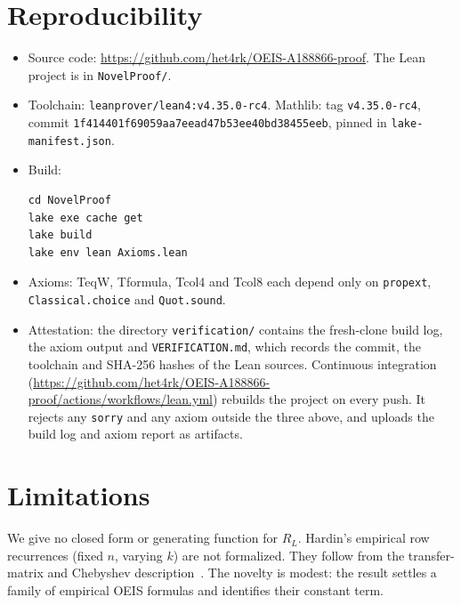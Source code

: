 \documentclass[11pt]{article}
\theoremstyle{remark}\newtheorem{remark}[theorem]{Remark}
\newcommand{\lean}[1]{{\ttfamily\def\_{\textunderscore\allowbreak}\def\/{/\allowbreak}#1}}
\begin{document}
\section{Reproducibility}
\begin{itemize}
\item Source code: \url{https://github.com/het4rk/OEIS-A188866-proof}. The Lean project is in \texttt{NovelProof/}.
\item Toolchain: \texttt{leanprover/lean4:v4.35.0-rc4}. Mathlib: tag \texttt{v4.35.0-rc4}, commit \nolinkurl{1f414401f69059aa7eead47b53ee40bd38455eeb}, pinned in \texttt{lake-manifest.json}.
\item Build:
\begin{verbatim}
cd NovelProof
lake exe cache get
lake build
lake env lean Axioms.lean
\end{verbatim}

\item Axioms: \lean{T\_eq\_W}, \lean{T\_formula}, \lean{T\_col4} and \lean{T\_col8} each depend only on \texttt{propext}, \texttt{Classical.choice} and \texttt{Quot.sound}.
\item Attestation: the directory \texttt{verification/} contains the fresh-clone build log, the axiom output and \texttt{VERIFICATION.md}, which records the commit, the toolchain and SHA-256 hashes of the Lean sources. Continuous integration (\url{https://github.com/het4rk/OEIS-A188866-proof/actions/workflows/lean.yml}) rebuilds the project on every push. It rejects any \texttt{sorry} and any axiom outside the three above, and uploads the build log and axiom report as artifacts.
\end{itemize}

\section{Limitations}
We give no closed form or generating function for $R_L$. Hardin's empirical row recurrences (fixed $n$, varying $k$) are not formalized. They follow from the transfer-matrix and Chebyshev description~\cite{kmmp}. The novelty is modest: the result settles a family of empirical OEIS formulas and identifies their constant term.
\end{document}
